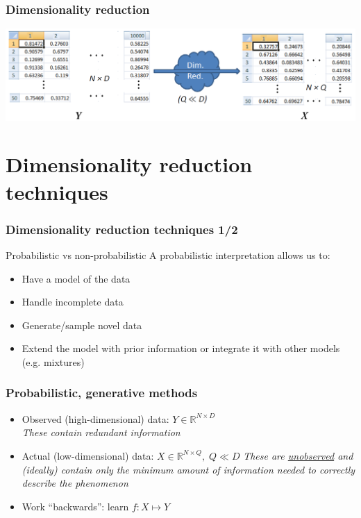 \documentclass{beamer}
\begin{document}
\begin{frame}
\frametitle{Dimensionality reduction}
\centering
	\includegraphics[width=1\textwidth]{dimReduction.png}
\end{frame}

\section{Dimensionality reduction techniques}
\begin{frame}
  \frametitle{Dimensionality reduction techniques 1/2}
    \alert{\Large{Probabilistic vs non-probabilistic}}\newline \newline
    	A probabilistic interpretation allows us to:
    	\begin{itemize}
    		\item Have a model of the data
    		\item Handle incomplete data
    		\item Generate/sample novel data
    		\item Extend the model with prior information or integrate it with other models (e.g. mixtures)
    	\end{itemize}
\end{frame}


\begin{frame}
\frametitle{Probabilistic, generative methods}
\begin{itemize}
\item \alert{Observed} (high-dimensional) data: $Y \in \mathbb{R}^{N \times D}$ \\
\emph{These contain redundant information}
\vspace{6pt}
\item \alert{Actual} (low-dimensional) data: \; \; $X \in \mathbb{R}^{N \times Q}, \; Q \ll D$
\emph{These are \underline{unobserved} and (ideally) contain only the minimum amount of information needed to correctly describe
 the phenomenon}
\vspace{6pt}
\item Work ``backwards'': learn $f: X \mapsto Y$
\vspace{6pt}
\end{itemize}
\end{frame}
\end{document}
